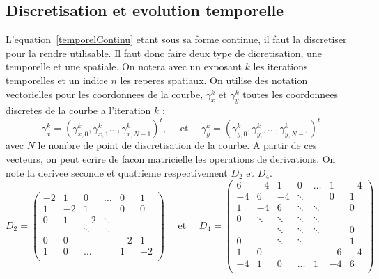 \documentclass[10pt,a4paper]{article}
\begin{document}
\subsection{Discretisation et evolution temporelle}
L'equation~\eqref{temporelContinu} etant sous sa forme continue, il faut la discretiser pour la rendre utilisable. Il faut donc faire deux type de dicretisation, une temporelle et une spatiale. On notera avec un exposant $k$ les iterations temporelles et un indice $n$ les reperes spatiaux. On utilise des notation vectorielles pour les coordonnees de la courbe, $\gamma_{x}^{k}$ et $\gamma_{y}^{k}$ toutes les coordonnees discretes de la courbe a l'iteration $k$ : 
\begin{displaymath}
	\gamma_{x}^{k} = (\gamma_{x,0}^{k},\gamma_{x,1}^{k}\ldots,\gamma_{x,N-1}^{k})^{t}, \quad\text{    et    }\quad \gamma_{y}^{k} = (\gamma_{y,0}^{k},\gamma_{y,1}^{k}\ldots,\gamma_{y,N-1}^{k})^{t}
\end{displaymath}
avec $N$ le nombre de point de discretisation de la courbe. A partir de ces vecteurs, on peut ecrire de facon matricielle les operations de derivations. On note la derivee seconde et quatrieme respectivement $D_2$ et $D_4$. 
\begin{displaymath}
	D_2 = \begin{pmatrix}
			 -2 & 1  & 0 & \ldots & 0 & 1\\
			 1  & -2 & 1 &             & 0 & 0 \\
			 0 & 1 & -2 &      \ddots        &   &  \\
			    &    &    \ddots  &      \ddots        &   &  \\
			0 & 0 &   &                & -2 & 1\\
			1 & 0 &  \ldots &  & 1 & -2\\
		 \end{pmatrix}
\quad\text{  et  }\quad
	D_4 = \begin{pmatrix}
			 6 & -4  & 1 & 0 &\ldots & 1 & -4\\
			 -4  & 6 & -4 & \ddots  &          & 0 & 1 \\
			 1 & -4 & 6 & \ddots   &   \ddots       &   & 0  \\
			  0  &  \ddots  &   \ddots   &  \ddots   &   \ddots      &   &  \\
			    &    &  \ddots    &  \ddots   &    \ddots     &   & 0 \\
			  0  &    &   \ddots   &  \ddots   &         &   & 1 \\
			1 & 0 &   &      &          & -6 & -4\\
			-4 & 1 &  0 & \ldots & 1 & -4 & 6\\
		 \end{pmatrix}
\end{displaymath}
\end{document}
